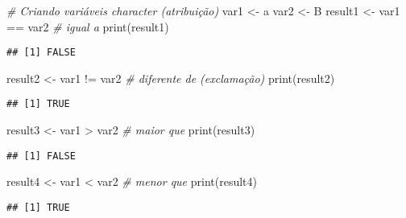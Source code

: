 \documentclass[
]{article}
\newenvironment{Shaded}{\begin{snugshade}}{\end{snugshade}}
\newcommand{\CommentTok}[1]{\textcolor[rgb]{0.56,0.35,0.01}{\textit{#1}}}
\newcommand{\FunctionTok}[1]{\textcolor[rgb]{0.00,0.00,0.00}{#1}}
\newcommand{\NormalTok}[1]{#1}
\newcommand{\OtherTok}[1]{\textcolor[rgb]{0.56,0.35,0.01}{#1}}
\newcommand{\SpecialCharTok}[1]{\textcolor[rgb]{0.00,0.00,0.00}{#1}}
\newcommand{\StringTok}[1]{\textcolor[rgb]{0.31,0.60,0.02}{#1}}
\begin{document}
\begin{Shaded}
\begin{Highlighting}[]
\CommentTok{\# Criando variáveis character (atribuição)}
\NormalTok{var1 }\OtherTok{\textless{}{-}} \StringTok{\textquotesingle{}a\textquotesingle{}}
\NormalTok{var2 }\OtherTok{\textless{}{-}} \StringTok{\textquotesingle{}B\textquotesingle{}}
\NormalTok{result1 }\OtherTok{\textless{}{-}}\NormalTok{ var1 }\SpecialCharTok{==}\NormalTok{ var2 }\CommentTok{\# igual a }
\FunctionTok{print}\NormalTok{(result1)}
\end{Highlighting}
\end{Shaded}

\begin{verbatim}
## [1] FALSE
\end{verbatim}

\begin{Shaded}
\begin{Highlighting}[]
\NormalTok{result2 }\OtherTok{\textless{}{-}}\NormalTok{ var1 }\SpecialCharTok{!=}\NormalTok{ var2 }\CommentTok{\# diferente de (exclamação)}
\FunctionTok{print}\NormalTok{(result2)}
\end{Highlighting}
\end{Shaded}

\begin{verbatim}
## [1] TRUE
\end{verbatim}

\begin{Shaded}
\begin{Highlighting}[]
\NormalTok{result3 }\OtherTok{\textless{}{-}}\NormalTok{ var1 }\SpecialCharTok{\textgreater{}}\NormalTok{ var2  }\CommentTok{\# maior que}
\FunctionTok{print}\NormalTok{(result3)}
\end{Highlighting}
\end{Shaded}

\begin{verbatim}
## [1] FALSE
\end{verbatim}

\begin{Shaded}
\begin{Highlighting}[]
\NormalTok{result4 }\OtherTok{\textless{}{-}}\NormalTok{ var1 }\SpecialCharTok{\textless{}}\NormalTok{ var2  }\CommentTok{\# menor que}
\FunctionTok{print}\NormalTok{(result4)}
\end{Highlighting}
\end{Shaded}

\begin{verbatim}
## [1] TRUE
\end{verbatim}
\end{document}
